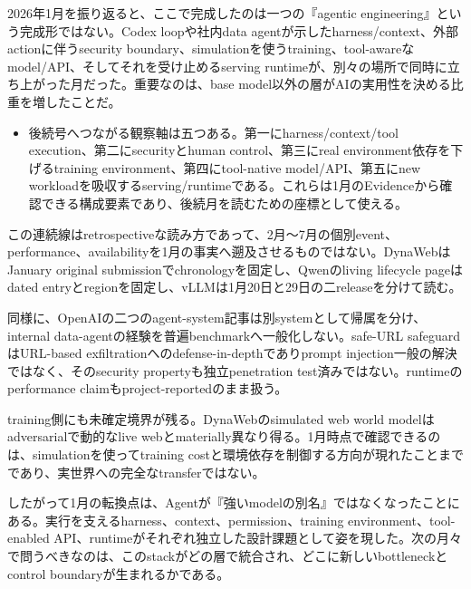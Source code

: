 
2026年1月を振り返ると、ここで完成したのは一つの『agentic engineering』という完成形ではない。Codex loopや社内data agentが示したharness/context、外部actionに伴うsecurity boundary、simulationを使うtraining、tool-awareなmodel/API、そしてそれを受け止めるserving runtimeが、別々の場所で同時に立ち上がった月だった。重要なのは、base model以外の層がAIの実用性を決める比重を増したことだ。\autocite{src-0d2abbb0fa62,src-3bc80a3c7870,src-85bc3e4f7b39,src-ae10eb4597fe,src-eac8dfbeb78c,src-fa5410010e0a}


\begin{itemize}
  \item 後続号へつながる観察軸は五つある。第一にharness/context/tool execution、第二にsecurityとhuman control、第三にreal environment依存を下げるtraining environment、第四にtool-native model/API、第五にnew workloadを吸収するserving/runtimeである。これらは1月のEvidenceから確認できる構成要素であり、後続月を読むための座標として使える。
\end{itemize}
\autocite{src-0d2abbb0fa62,src-85bc3e4f7b39,src-ae10eb4597fe,src-d9f9de620203,src-eac8dfbeb78c}

\begin{claimboundary}
この連続線はretrospectiveな読み方であって、2月〜7月の個別event、performance、availabilityを1月の事実へ遡及させるものではない。DynaWebはJanuary original submissionでchronologyを固定し、Qwenのliving lifecycle pageはdated entryとregionを固定し、vLLMは1月20日と29日の二releaseを分けて読む。\autocite{src-3bc80a3c7870,src-85bc3e4f7b39,src-d9f9de620203,src-eac8dfbeb78c}
\end{claimboundary}

\begin{claimboundary}
同様に、OpenAIの二つのagent-system記事は別systemとして帰属を分け、internal data-agentの経験を普遍benchmarkへ一般化しない。safe-URL safeguardはURL-based exfiltrationへのdefense-in-depthでありprompt injection一般の解決ではなく、そのsecurity propertyも独立penetration test済みではない。runtimeのperformance claimもproject-reportedのまま扱う。\autocite{src-0d2abbb0fa62,src-3bc80a3c7870,src-ae10eb4597fe,src-d9f9de620203,src-fa5410010e0a}
\end{claimboundary}

\begin{claimboundary}
training側にも未確定境界が残る。DynaWebのsimulated web world modelはadversarialで動的なlive webとmaterially異なり得る。1月時点で確認できるのは、simulationを使ってtraining costと環境依存を制御する方向が現れたことまでであり、実世界への完全なtransferではない。\autocite{src-85bc3e4f7b39}
\end{claimboundary}

したがって1月の転換点は、Agentが『強いmodelの別名』ではなくなったことにある。実行を支えるharness、context、permission、training environment、tool-enabled API、runtimeがそれぞれ独立した設計課題として姿を現した。次の月々で問うべきなのは、このstackがどの層で統合され、どこに新しいbottleneckとcontrol boundaryが生まれるかである。\autocite{src-0d2abbb0fa62,src-3bc80a3c7870,src-85bc3e4f7b39,src-ae10eb4597fe,src-eac8dfbeb78c}
